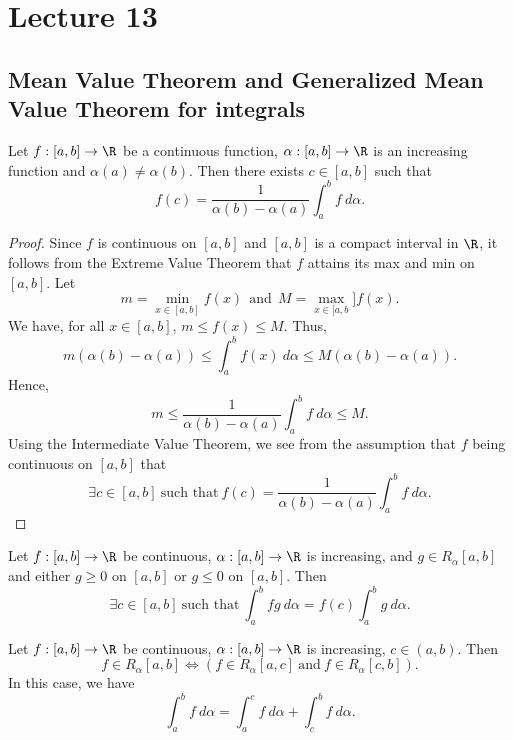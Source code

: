 \section{Lecture 13}

\subsection{Mean Value Theorem and Generalized Mean Value Theorem for integrals}\label{Mean Value Theorem and Generalized Mean Value Theorem for integrals}

\begin{theorem}\label{Mean Value Theorem and Generalize }
    Let \( f:[a,b] \to \R  \) be a continuous function, \( \alpha:[a,b] \to \R  \) is an increasing function and \( \alpha(a) \neq \alpha(b) \). Then there exists \( c \in [a,b] \) such that 
    \[  f(c) = \frac{ 1 }{  \alpha(b) - \alpha(a) }   \int_{ a }^{ b }  f  \ d \alpha. \]
\end{theorem}
\begin{proof}
    Since \( f  \) is continuous on \( [a,b] \) and \( [a,b] \) is a compact interval in \( \R  \), it follows from the Extreme Value Theorem that \( f  \) attains its max and min on \( [a,b] \). Let 
    \[  m = \min_{x \in [a,b]} f(x) \ \ \text{and} \ \ M = \max_{x \in [a,b}] f(x). \]
    We have, for all \( x \in [a,b] \), \( m \leq f(x) \leq M  \). Thus, 
    \[  m(\alpha(b) - \alpha(a)) \leq \int_{ a }^{ b }  f(x) \ d \alpha \leq M(\alpha(b) - \alpha(a)).\]
    Hence, 
    \[  m \leq \frac{ 1 }{  \alpha(b) - \alpha(a)  }  \int_{ a }^{ b }  f  \ d \alpha \leq M.  \]
    Using the Intermediate Value Theorem, we see from the assumption that \( f  \) being continuous on \( [a,b]  \) that
    \[  \exists c \in [a,b] \ \text{such that} \ f(c) = \frac{ 1 }{ \alpha(b) - \alpha(a) } \int_{ a }^{ b }  f \ d \alpha. \]
\end{proof}

\begin{theorem}
    Let \( f:[a,b] \to \R  \) be continuous, \( \alpha:[a,b] \to \R  \) is increasing, and \( g \in {R}_{\alpha}[a,b]  \) and either \( g \geq 0  \) on \( [a,b] \) or \( g \leq 0  \) on \( [a,b] \). Then
    \[  \exists c \in [a,b] \ \text{such that} \ \int_{ a }^{ b }  fg  \ d \alpha = f(c) \int_{ a }^{ b }  g  \ d \alpha. \]
\end{theorem}

\begin{theorem}\label{Additivity for R.S integrals}
    Let \( f:[a,b]  \to \R \) be continuous, \( \alpha:[a,b] \to \R  \) is increasing, \( c \in (a,b) \). Then
    \[  f \in {R}_{\alpha}[a,b] \iff (f \in {R}_{\alpha}[a,c] \ \text{and} \ f \in {R}_{\alpha}[c,b]). \]
    In this case, we have 
    \[  \int_{ a }^{ b }  f  \ d \alpha = \int_{ a }^{ c }  f  \ d \alpha + \int_{ c }^{ b  }  f \ d \alpha. \]
\end{theorem}

